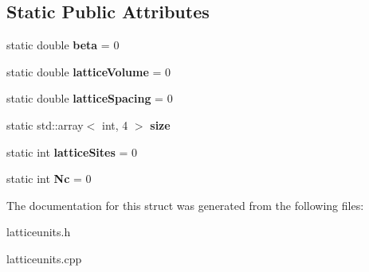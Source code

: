 \subsection*{Static Public Attributes}
\begin{DoxyCompactItemize}
\item 
static double {\bfseries beta} = 0\hypertarget{structLatticeUnits_a07cbe4095d071daafe1068234f11699f}{}\label{structLatticeUnits_a07cbe4095d071daafe1068234f11699f}

\item 
static double {\bfseries lattice\+Volume} = 0\hypertarget{structLatticeUnits_aa04f5342b8d59e53d1e57f8cdae7f1ad}{}\label{structLatticeUnits_aa04f5342b8d59e53d1e57f8cdae7f1ad}

\item 
static double {\bfseries lattice\+Spacing} = 0\hypertarget{structLatticeUnits_ad0f338c6c485987dbe74d86721b2a7d0}{}\label{structLatticeUnits_ad0f338c6c485987dbe74d86721b2a7d0}

\item 
static std\+::array$<$ int, 4 $>$ {\bfseries size}\hypertarget{structLatticeUnits_a47b6abc1f1533e85a206a1dd8c606c22}{}\label{structLatticeUnits_a47b6abc1f1533e85a206a1dd8c606c22}

\item 
static int {\bfseries lattice\+Sites} = 0\hypertarget{structLatticeUnits_a117541e2535e1ee6a027ac582f6fab60}{}\label{structLatticeUnits_a117541e2535e1ee6a027ac582f6fab60}

\item 
static int {\bfseries Nc} = 0\hypertarget{structLatticeUnits_a9307d649e2e898fcfe09d72b04e0aa6c}{}\label{structLatticeUnits_a9307d649e2e898fcfe09d72b04e0aa6c}

\end{DoxyCompactItemize}


The documentation for this struct was generated from the following files\+:\begin{DoxyCompactItemize}
\item 
latticeunits.\+h\item 
latticeunits.\+cpp\end{DoxyCompactItemize}
